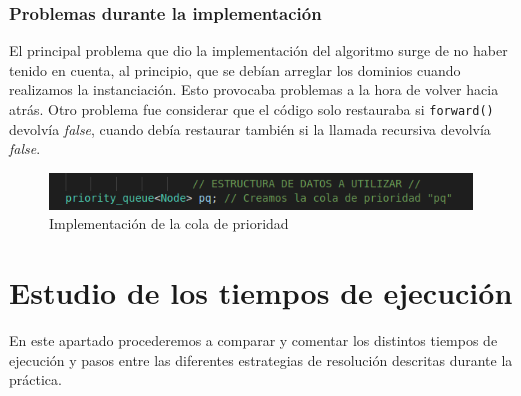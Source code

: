 \documentclass[12pt]{article}
\begin{document}
\verb||
\textbf{}
\textit{}

\subsubsection{Problemas durante la implementación}

El principal problema que dio la implementación del algoritmo surge de no haber tenido en cuenta, al principio,
que se debían arreglar los dominios cuando realizamos la instanciación. Esto provocaba problemas a la hora de volver hacia atrás. Otro
problema fue considerar que el código solo restauraba si \verb|forward()| devolvía \textit{false}, cuando debía restaurar también si la 
llamada recursiva devolvía \textit{false}.

\begin{figure}[h]
    \centering
    \includegraphics[scale=0.5]{cola_de_prior.png}
    \caption{Implementación de la cola de prioridad}
    \label{fig:colprior}
\end{figure}

\section{Estudio de los tiempos de ejecución}

En este apartado procederemos a comparar y comentar los distintos tiempos de ejecución y pasos entre las diferentes estrategias 
de resolución descritas durante la práctica.
\end{document}
